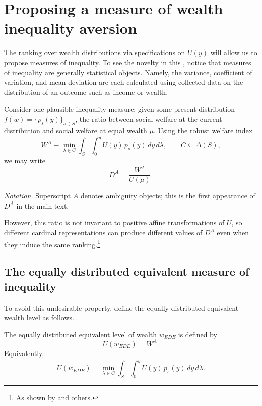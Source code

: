 \documentclass[Chp3.tex]{subfiles}
\begin{document}
\section{Proposing a measure of wealth inequality aversion}
\label{sec:Altmeasure}


\par The ranking over wealth distributions via specifications on $U(y)$ will allow us to propose measures of inequality. To see the novelty in this , notice that measures of inequality are generally statistical objects. Namely, the variance, coefficient of variation, and mean deviation are each calculated using collected data on the distribution of an outcome such as income or wealth.

\par Consider one plausible inequality measure: given some present distribution $f(w)=\{p_s(y)\}_{s\in S}$, the ratio between social welfare at the current distribution and social welfare at equal wealth $\mu$. Using the robust welfare index
\[
W^{A} \equiv \min_{\lambda \in C}\int_S\int_0^{\bar y} U(y)\,p_s(y)\,dy\,d\lambda,
\qquad C\subseteq \Delta(S),
\]
we may write
\[
D^{A} = \frac{W^{A}}{U(\mu)}.
\]

\par \textit{Notation.} Superscript $A$ denotes ambiguity objects; this is the first appearance of $D^{A}$ in the main text.

\par However, this ratio is not invariant to positive affine transformations of $U$, so different cardinal representations can produce different values of $D^{A}$ even when they induce the same ranking.\footnote{As shown by \cite{hd20} and others.}

\subsection{The equally distributed equivalent measure of inequality}

\par To avoid this undesirable property, define the equally distributed equivalent wealth level as follows.

\begin{dfn}
The equally distributed equivalent level of wealth $w_{EDE}$ is defined by
\[
U(w_{EDE}) = W^{A}.
\]
Equivalently,
\[
U(w_{EDE}) = \min_{\lambda \in C}\int_S\int_0^{\bar y} U(y)\,p_s(y)\,dy\,d\lambda.
\]
\end{dfn}
\end{document}
